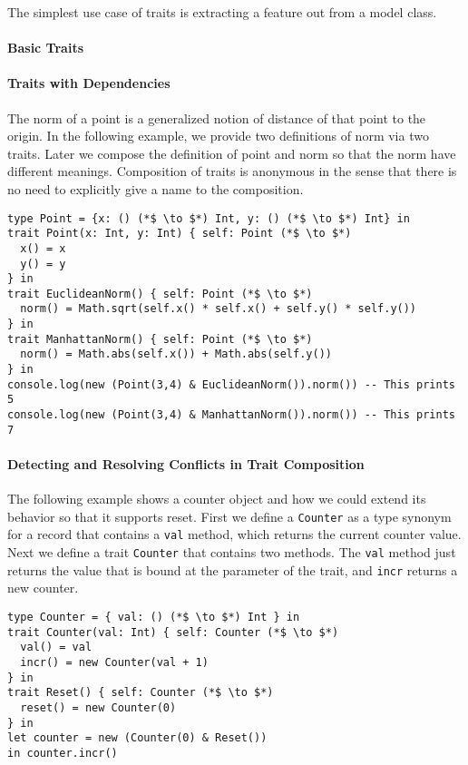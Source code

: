 The simplest use case of traits is extracting a feature out from a model class.

\paragraph{Basic Traits} 

\paragraph{Traits with Dependencies}
The norm of a point is a generalized notion of distance of that point to the
origin. In the following example, we provide two definitions of norm via two
traits. Later we compose the definition of point and norm so that the norm have
different meanings. Composition of traits is anonymous in the sense that there
is no need to explicitly give a name to the composition.

\begin{lstlisting}
type Point = {x: () (*$ \to $*) Int, y: () (*$ \to $*) Int} in
trait Point(x: Int, y: Int) { self: Point (*$ \to $*)
  x() = x
  y() = y
} in
trait EuclideanNorm() { self: Point (*$ \to $*)
  norm() = Math.sqrt(self.x() * self.x() + self.y() * self.y())
} in
trait ManhattanNorm() { self: Point (*$ \to $*)
  norm() = Math.abs(self.x()) + Math.abs(self.y())
} in
console.log(new (Point(3,4) & EuclideanNorm()).norm()) -- This prints 5
console.log(new (Point(3,4) & ManhattanNorm()).norm()) -- This prints 7
\end{lstlisting}

\paragraph{Detecting and Resolving Conflicts in Trait Composition}
The following example shows a counter object and how we could extend its
behavior so that it supports reset. First we define a \lstinline$Counter$ as a
type synonym for a record that contains a \lstinline$val$ method, which returns
the current counter value. Next we define a trait \lstinline$Counter$ that
contains two methods. The \lstinline$val$ method just returns the value that is
bound at the parameter of the trait, and \lstinline$incr$ returns a new counter.

\begin{lstlisting}
type Counter = { val: () (*$ \to $*) Int } in
trait Counter(val: Int) { self: Counter (*$ \to $*)
  val() = val
  incr() = new Counter(val + 1)
} in
trait Reset() { self: Counter (*$ \to $*)
  reset() = new Counter(0)
} in
let counter = new (Counter(0) & Reset())
in counter.incr()
\end{lstlisting}

